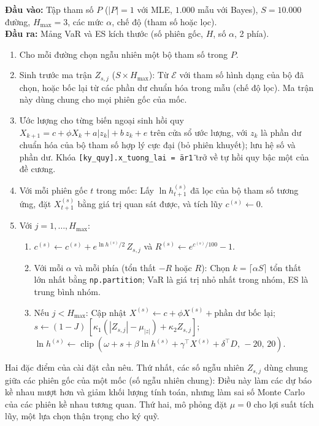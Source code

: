 \documentclass[12pt,a4paper]{article}
\newcounter{thuattoan}
\newenvironment{thuattoan}[1]{%
  \refstepcounter{thuattoan}%
  \begin{tcolorbox}[enhanced,breakable,colback=nenkhung,colframe=vienkhung,boxrule=0.5pt,arc=1mm,
    left=6pt,right=6pt,top=4pt,bottom=4pt,
    title={\textbf{Thuật toán \thethuattoan.} #1},coltitle=black,colbacktitle=nenkhung!60!vienkhung!25]%
  \small
}{\end{tcolorbox}}
\theoremstyle{remark}
\newcommand{\Ecal}{\mathcal{E}}
\newcommand{\ma}[1]{\texttt{\small #1}}
\begin{document}
\begin{thuattoan}{Mô phỏng VaR và ES $H$ phiên cho một mốc (hàm \ma{mo\_phong\_moc})}
\textbf{Đầu vào:} Tập tham số $P$ ($|P|=1$ với MLE, $1.000$ mẫu với Bayes), $S=10.000$ đường, $H_{\max}=3$, các mức $\alpha$, chế độ (tham số hoặc lọc).\\
\textbf{Đầu ra:} Mảng VaR và ES kích thước (số phiên gốc, $H$, số $\alpha$, 2 phía).
\begin{enumerate}
\item Cho mỗi đường chọn ngẫu nhiên một bộ tham số trong $P$.
\item Sinh trước ma trận $Z_{s,j}$ ($S\times H_{\max}$): Từ $\Ecal$ với tham số hình dạng của bộ đã chọn, hoặc bốc lại từ các phần dư chuẩn hóa trong mẫu (chế độ lọc). Ma trận này dùng chung cho mọi phiên gốc của mốc.
\item Ước lượng cho từng biến ngoại sinh hồi quy $X_{k+1}=c+\phi X_k+a|z_k|+b\,z_k+e$ trên cửa sổ ước lượng, với $z_k$ là phần dư chuẩn hóa của bộ tham số hợp lý cực đại (bỏ phiên khuyết); lưu hệ số và phần dư. Khóa \ma{[ky\_quy].x\_tuong\_lai = \"ar1\"} trở về tự hồi quy bậc một của đề cương.
\item Với mỗi phiên gốc $t$ trong mốc: Lấy $\ln h^{(s)}_{t+1}$ đã lọc của bộ tham số tương ứng, đặt $X^{(s)}_{t+1}$ bằng giá trị quan sát được, và tích lũy $c^{(s)}\leftarrow0$.
\item Với $j=1,\dots,H_{\max}$:
 \begin{enumerate}
 \item $c^{(s)}\leftarrow c^{(s)}+e^{\ln h^{(s)}/2}\,Z_{s,j}$ và $R^{(s)}\leftarrow e^{c^{(s)}/100}-1$.
 \item Với mỗi $\alpha$ và mỗi phía (tổn thất $-R$ hoặc $R$): Chọn $k=\lceil\alpha S\rceil$ tổn thất lớn nhất bằng \ma{np.partition}; VaR là giá trị nhỏ nhất trong nhóm, ES là trung bình nhóm.
 \item Nếu $j<H_{\max}$: Cập nhật $X^{(s)}\leftarrow c+\phi X^{(s)}+\text{phần dư bốc lại}$; $s\leftarrow(1-J)\,[\kappa_1(|Z_{s,j}|-\mu_{|z|})+\kappa_2 Z_{s,j}]$; $\ln h^{(s)}\leftarrow\operatorname{clip}(\omega+s+\beta\ln h^{(s)}+\gamma^\top X^{(s)}+\delta^\top D,\,-20,\,20)$.
 \end{enumerate}
\end{enumerate}
\end{thuattoan}

Hai đặc điểm của cài đặt cần nêu. Thứ nhất, các số ngẫu nhiên $Z_{s,j}$ dùng chung giữa các phiên gốc của một mốc (số ngẫu nhiên chung): Điều này làm các dự báo kề nhau mượt hơn và giảm khối lượng tính toán, nhưng làm sai số Monte Carlo của các phiên kề nhau tương quan. Thứ hai, mô phỏng đặt $\mu=0$ cho lợi suất tích lũy, một lựa chọn thận trọng cho ký quỹ.
\end{document}
